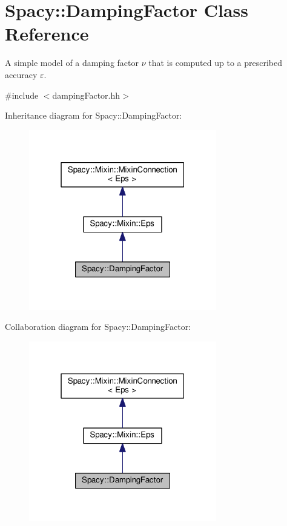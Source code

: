 \hypertarget{classSpacy_1_1DampingFactor}{}\section{Spacy\+:\+:Damping\+Factor Class Reference}
\label{classSpacy_1_1DampingFactor}


A simple model of a damping factor $\nu$ that is computed up to a prescribed accuracy $\varepsilon$.  




{\ttfamily \#include $<$damping\+Factor.\+hh$>$}



Inheritance diagram for Spacy\+:\+:Damping\+Factor\+:\nopagebreak
\begin{figure}[H]
\begin{center}
\leavevmode
\includegraphics[width=232pt]{classSpacy_1_1DampingFactor__inherit__graph}
\end{center}
\end{figure}


Collaboration diagram for Spacy\+:\+:Damping\+Factor\+:\nopagebreak
\begin{figure}[H]
\begin{center}
\leavevmode
\includegraphics[width=232pt]{classSpacy_1_1DampingFactor__coll__graph}
\end{center}
\end{figure}
